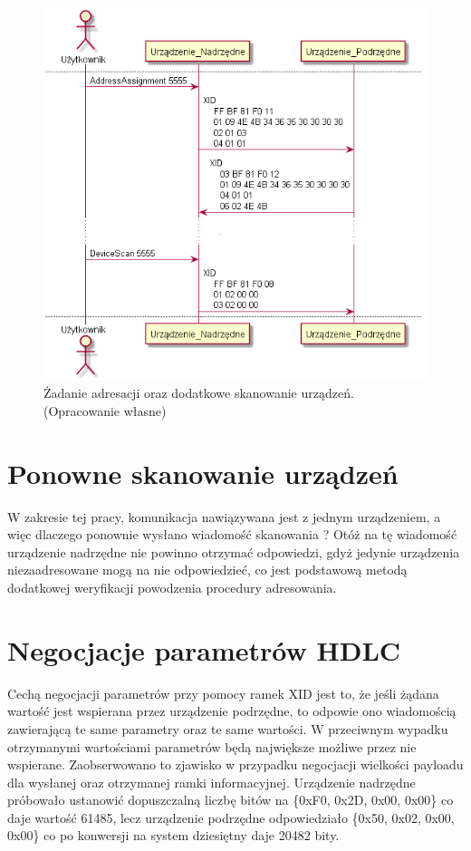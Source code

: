     \begin{figure}[h!]
        \centering
        \includegraphics[scale=0.75]{out/Diagramy/UML_DiagramOfSequence_New/UML_DiagramOfSequence_New-page2.png}
        \caption{Żadanie adresacji oraz dodatkowe skanowanie urządzeń.
            \newline(Opracowanie własne)}
        \label{fig:DiagramSequence_AddressAssignment_SecondDeviceScan}
    \end{figure}

    \section{Ponowne skanowanie urządzeń}
    W zakresie tej pracy, komunikacja nawiązywana jest z jednym urządzeniem, a więc dlaczego
    ponownie wysłano wiadomość skanowania ? Otóż na tę wiadomość urządzenie nadrzędne
    nie powinno otrzymać odpowiedzi, gdyż jedynie urządzenia niezaadresowane mogą na nie 
    odpowiedzieć, co jest podstawową metodą dodatkowej weryfikacji powodzenia procedury
    adresowania.

    \section{Negocjacje parametrów HDLC}
    Cechą negocjacji parametrów przy pomocy ramek XID jest to, że jeśli żądana wartość jest wspierana przez
    urządzenie podrzędne, to odpowie ono wiadomością zawierającą te same parametry oraz te same wartości. 
    W przeciwnym wypadku otrzymanymi wartościami parametrów będą największe możliwe przez nie wspierane.
    Zaobserwowano to zjawisko w przypadku negocjacji wielkości payloadu dla wysłanej oraz otrzymanej ramki informacyjnej.
    Urządzenie nadrzędne próbowało ustanowić dopuszczalną liczbę bitów na \{0xF0, 0x2D, 0x00, 0x00\} co daje wartość 61485,
    lecz urządzenie podrzędne odpowiedziało \{0x50, 0x02, 0x00, 0x00\} co po konwersji na system dziesiętny daje 20482 bity.

